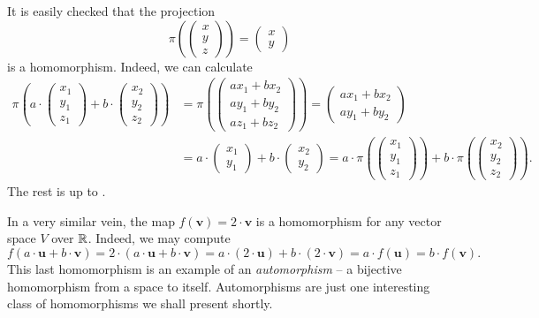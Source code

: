 It is easily checked that the projection
\[
 \pi \left( 
  \begin{pmatrix}
   x\\
   y\\
   z
  \end{pmatrix}
 \right) = 
 \begin{pmatrix}
  x\\
  y
 \end{pmatrix}
\]
is a homomorphism. Indeed, we can calculate
\begin{align*}
 \pi \left( a \cdot 
 \begin{pmatrix}
  x_1\\
  y_1\\
  z_1
 \end{pmatrix} + b \cdot 
 \begin{pmatrix}
  x_2\\
  y_2\\
  z_2
 \end{pmatrix}
\right) &= 
 \pi \left( 
 \begin{pmatrix}
  ax_1 + bx_2\\
  ay_1 + by_2\\
  az_1 + bz_2
 \end{pmatrix}
 \right) = 
 \begin{pmatrix}
  ax_1 + bx_2\\
  ay_1 + by_2
 \end{pmatrix}
 \\
        &=a \cdot 
 \begin{pmatrix}
  x_1\\
  y_1
 \end{pmatrix}
 + b \cdot 
 \begin{pmatrix}
  x_2\\
  y_2
 \end{pmatrix} = 
 a \cdot \pi
 \left( 
 \begin{pmatrix}
  x_1\\
  y_1\\
  z_1
 \end{pmatrix}
 \right) + b \cdot \pi \left( 
 \begin{pmatrix}
  x_2\\
  y_2\\
  z_2
 \end{pmatrix}
 \right).
\end{align*}
The rest is up to .

In a very similar vein, the map $f(\mathbf{v}) = 2 \cdot \mathbf{v}$ is a
homomorphism for any vector space $V$ over $\mathbb{R}$. Indeed, we may compute
\[
 f(a \cdot \mathbf{u} + b \cdot \mathbf{v}) = 2 \cdot (a \cdot \mathbf{u} + b
 \cdot \mathbf{v}) = a \cdot (2 \cdot \mathbf{u}) + b \cdot (2 \cdot \mathbf{v})
 = a \cdot f(\mathbf{u}) = b \cdot f(\mathbf{v}).
\]
This last homomorphism is an example of an \emph{automorphism} -- a bijective
homomorphism from a space to itself. Automorphisms are just one interesting
class of homomorphisms we shall present shortly.

